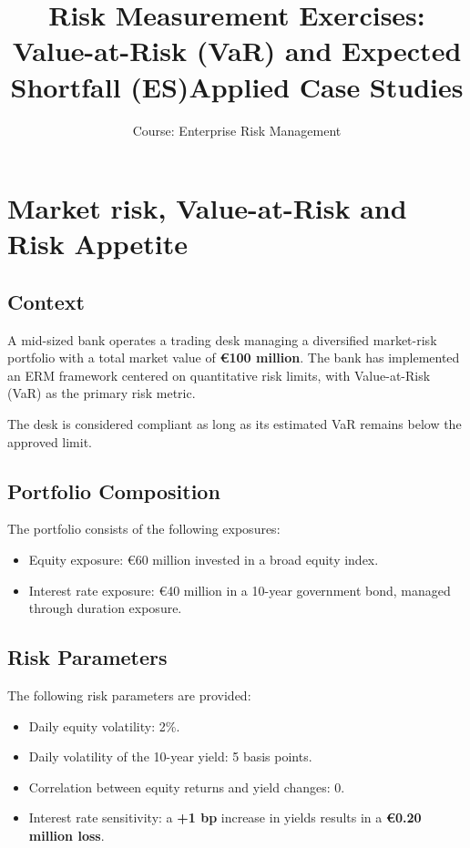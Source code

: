 \documentclass[11pt]{article}
\title{\textbf{Risk Measurement Exercises: Value-at-Risk (VaR) and Expected Shortfall (ES)}}
\author{}
\date{}
\title{\textbf{Applied Case Studies}}
\author{Course: Enterprise Risk Management}
\date{}
\begin{document}
\maketitle

\onehalfspacing


\section{Market risk, Value-at-Risk and Risk Appetite}

\subsection*{Context}

A mid-sized bank operates a trading desk managing a diversified market-risk
portfolio with a total market value of \textbf{€100 million}. The bank has
implemented an ERM framework centered on quantitative risk limits, with
Value-at-Risk (VaR) as the primary risk metric.

The desk is considered compliant as long as its estimated VaR remains below
the approved limit.

\subsection*{Portfolio Composition}

The portfolio consists of the following exposures:
\begin{itemize}
    \item Equity exposure: €60 million invested in a broad equity index.
    \item Interest rate exposure: €40 million in a 10-year government bond,
    managed through duration exposure.
\end{itemize}

\subsection*{Risk Parameters}

The following risk parameters are provided:
\begin{itemize}
    \item Daily equity volatility: 2\%.
    \item Daily volatility of the 10-year yield: 5 basis points.
    \item Correlation between equity returns and yield changes: 0.
    \item Interest rate sensitivity: a \textbf{+1 bp} increase in yields results
    in a \textbf{€0.20 million loss}.
\end{itemize}
\end{document}
